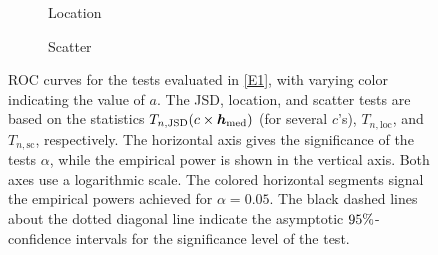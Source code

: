 \documentclass[oneside,11pt]{article}
\begin{document}
\begin{figure}[htpb!]
\begin{subfigure}{0.25\textwidth}
        \centering
        \caption{\small Location} \label{fig:E1:g}
    \end{subfigure}%
    \begin{subfigure}{0.25\textwidth}
        \centering
        \caption{\small Scatter} \label{fig:E1:h}
    \end{subfigure}
    \caption{\small ROC curves for the tests evaluated in \ref{E1}, with varying color indicating the value of $a$. The JSD, location, and scatter tests are based on the statistics $T_{n,\mathrm{JSD}}(c\times{\boldsymbol{h}}_\mathrm{med})$ (for several $c$'s), $T_{n,\mathrm{loc}}$, and $T_{n,\mathrm{sc}}$, respectively. The horizontal axis gives the significance of the tests $\alpha$, while the empirical power is shown in the vertical axis. Both axes use a logarithmic scale. The colored horizontal segments signal the empirical powers achieved for $\alpha=0.05$. The black dashed lines about the dotted diagonal line indicate the asymptotic $95\%$-confidence intervals for the significance level of the test.}
    \label{fig:E1}
\end{figure}
\end{document}
